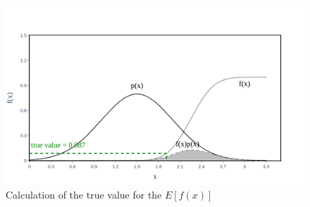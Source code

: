     \begin{figure}[H]
        \centering
        \includegraphics[scale=0.30]{Figures/Images/Illustrative Example/true_value.png}
        \caption{Calculation of the true value for the $E[f(x)]$}
        \label{fig:true_value}
    \end{figure}